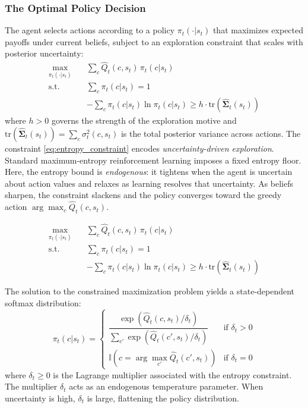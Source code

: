 \subsubsection{The Optimal Policy Decision}

The agent selects actions according to a policy $\pi_t(\cdot | s_t)$ that maximizes 
expected payoffs under current beliefs, subject to an exploration constraint that 
scales with posterior uncertainty:
\begin{align}
\max_{\pi_t(\cdot | s_t)} \quad & \sum_c \hat{Q}_t(c, s_t) \, \pi_t(c | s_t) \\
\text{s.t.} \quad & \sum_c \pi_t(c | s_t) = 1 \\
    & -\sum_c \pi_t(c | s_t) \ln \pi_t(c | s_t) \geq h \cdot \text{tr}\!\left(\hat{\boldsymbol{\Sigma}}_t(s_t)\right) \label{eq:entropy_constraint}
\end{align}
where $h > 0$ governs the strength of the exploration motive and 
$\text{tr}(\hat{\boldsymbol{\Sigma}}_t(s_t)) = \sum_c \sigma^2_t(c, s_t)$ is the 
total posterior variance across actions.
The constraint \eqref{eq:entropy_constraint} encodes \textit{uncertainty-driven exploration}. 
Standard maximum-entropy reinforcement learning imposes a fixed entropy floor.
Here, the entropy bound is \textit{endogenous}: it tightens when the agent is uncertain 
about action values and relaxes as learning resolves that uncertainty. As beliefs sharpen, the 
constraint slackens and the policy converges toward the greedy action 
$\arg\max_c \hat{Q}_t(c, s_t)$.

\begin{align}
\max_{\pi_t(\cdot | s_t)} \quad & \sum_c \hat{Q}_t(c, s_t) \, \pi_t(c | s_t) \\
\text{s.t.} \quad & \sum_c \pi_t(c | s_t) = 1 \\
    & -\sum_c \pi_t(c | s_t) \ln \pi_t(c | s_t) \geq h \cdot \text{tr}\!\left(\hat{\boldsymbol{\Sigma}}_t(s_t)\right) \label{eq:entropy_constraint}
\end{align}
\begin{proposition} \label{prop:optimal_policy}
    The solution to the constrained maximization problem yields a state-dependent softmax distribution:
    \begin{equation}
        \pi_t(c | s_t) = \begin{cases} 
        \dfrac{\exp\left(\hat{Q}_t(c, s_t) / \delta_t\right)}{\sum_{c'} \exp\left(\hat{Q}_t(c', s_t) / \delta_t\right)} & \text{if } \delta_t > 0 \\[3ex] 
        \mathbb{I}\left(c = \arg\max_{c'} \hat{Q}_t(c', s_t)\right) & \text{if } \delta_t = 0 
        \end{cases}
    \end{equation}
    where $\delta_t \geq 0$ is the Lagrange multiplier associated with the entropy constraint.
    The multiplier $\delta_t$ acts as an endogenous temperature parameter. When 
uncertainty is high, $\delta_t$ is large, flattening the policy distribution.
\end{proposition}


